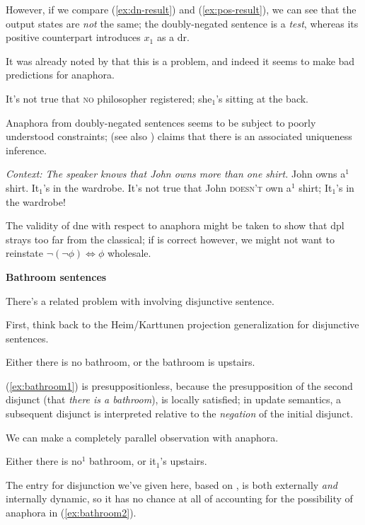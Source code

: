 \documentclass[nols,twoside,nofonts,nobib,nohyper]{tufte-handout}
\theoremstyle{definition}
\begin{document}
However, if we compare (\ref{ex:dn-result}) and (\ref{ex:pos-result}), we can see that the output states are \textit{not} the same; the doubly-negated sentence is a \textit{test}, whereas its positive counterpart introduces $x_{1}$ as a \ac{dr}.

It was already noted by \citeauthor{GroenendijkStokhof1991} that this is a problem, and indeed it seems to make bad predictions for anaphora.

\ex
It's not true that \textsc{no} philosopher registered; she$_{1}$'s sitting at the back.
\xe

Anaphora from doubly-negated sentences seems to be subject to poorly understood constraints; \citet{Gotham2019} (see also \citealt{KrahmerMuskens1995}) claims that there is an associated uniqueness inference.

\pex \textit{Context: The speaker knows that John owns more than one shirt.}
\a John owns a$^{1}$ shirt. It$_{1}$'s in the wardrobe.
\a{}It's not true that John \textsc{doesn't} own a$^{1}$ shirt; It$_{1}$'s in the wardrobe!
\xe

The validity of \ac{dne} with respect to anaphora might be taken to show that \ac{dpl} strays too far from the classical; if \citeauthor{Gotham2019} is correct however, we might not want to reinstate $¬ (¬ ϕ) ⇔ ϕ$ wholesale.

\textbf{Bathroom sentences}

There's a related problem with involving disjunctive sentence.

First, think back to the Heim/Karttunen projection generalization for disjunctive sentences.

\ex
Either there is no bathroom, or the bathroom is upstairs.\label{ex:bathroom1}
\xe

(\ref{ex:bathroom1}) is presuppositionless, because the presupposition of the second disjunct (that \textit{there is a bathroom}), is locally satisfied; in update semantics, a subsequent disjunct is interpreted relative to the \textit{negation} of the initial disjunct.

We can make a completely parallel observation with anaphora.

\ex
Either there is no$^{1}$ bathroom, or it$_{1}$'s upstairs.\label{ex:bathroom2}
\xe

The entry for disjunction we've given here, based on \citet{GroenendijkStokhof1991}, is both externally \textit{and} internally dynamic, so it has no chance at all of accounting for the possibility of anaphora in (\ref{ex:bathroom2}).
\end{document}
